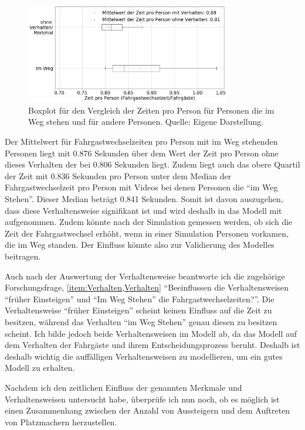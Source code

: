 \begin{figure}[H]
	\centering
		\includegraphics[width=0.8\textwidth]{pictures/data_evaluation/behavior/comp_ImWeg.png}
	\caption{Boxplot für den Vergleich der Zeiten pro Person für Personen die im Weg stehen und für andere Personen. Quelle: Eigene Darstellung.}
	\label{fig:BoxPlotImWeg}
\end{figure}
Der Mittelwert für Fahrgastwechselzeiten pro Person mit im Weg stehenden Personen liegt mit 0.876 Sekunden über dem Wert der Zeit pro Person ohne dieses Verhalten der bei 0.806 Sekunden liegt. Zudem liegt auch das obere Quartil der Zeit mit 0.836 Sekunden pro Person unter dem Median der Fahrgastwechselzeit pro Person mit Videos bei denen Personen die "`im Weg Stehen"'. Dieser Median beträgt 0.841 Sekunden. Somit ist davon auszugehen, dass diese Verhaltensweise signifikant ist und wird deshalb in das Modell mit aufgenommen. Zudem könnte nach der Simulation gemessen werden, ob sich die Zeit der Fahrgastwechsel erhöht, wenn in einer Simulation Personen vorkamen, die im Weg standen. Der Einfluss könnte also zur Validierung des Modelles beitragen.

Auch nach der Auswertung der Verhaltensweise beantworte ich die zugehörige Forschungsfrage, \ref{item:Verhalten,Verhalten} "`Beeinflussen die Verhaltensweisen "`früher Einsteigen"' und "`Im Weg Stehen"' die Fahrgastwechselzeiten?"'. Die Verhaltensweise "`früher Einsteigen"' scheint keinen Einfluss auf die Zeit zu besitzen, während das Verhalten "`im Weg Stehen"' genau diesen zu besitzen scheint. Ich bilde jedoch beide Verhaltensweisen im Modell ab, da das Modell auf dem Verhalten der Fahrgäste und ihrem Entscheidungsprozess beruht. Deshalb ist deshalb wichtig die auffälligen Verhaltensweisen zu modellieren, um ein gutes Modell zu erhalten.

Nachdem ich den zeitlichen Einfluss der genannten Merkmale und Verhaltensweisen untersucht habe, überprüfe ich nun noch, ob es möglich ist einen Zusammenhang zwischen der Anzahl von Aussteigern und dem Auftreten von Platzmachern herzustellen.

